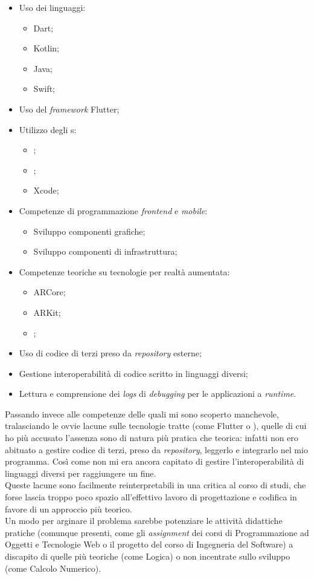 \begin{itemize}
  \item Uso dei linguaggi:
      \begin{itemize}
        \item Dart;
        \item Kotlin;
        \item Java;
        \item Swift;
      \end{itemize}
  \item Uso del \textit{framework} Flutter;
  \item Utilizzo degli \ide{}s:
      \begin{itemize}
        \item \vsc{};
        \item \astudio{};
        \item Xcode;
      \end{itemize}
  \item Competenze di programmazione \textit{frontend} e \textit{mobile}:
      \begin{itemize}
        \item Sviluppo componenti grafiche;
        \item Sviluppo componenti di infrastruttura;
      \end{itemize}
  \item Competenze teoriche su tecnologie per realtà aumentata:
      \begin{itemize}
        \item ARCore;
        \item ARKit;
        \item \asa;
      \end{itemize}
  \item Uso di codice di terzi preso da \textit{repository} esterne;
  \item Gestione interoperabilità di codice scritto in linguaggi diversi;
  \item Lettura e comprensione dei \textit{logs} di \textit{debugging} per le applicazioni a \textit{runtime}.
\end{itemize}

Passando invece alle competenze delle quali mi sono scoperto manchevole, tralasciando le ovvie lacune sulle tecnologie tratte (come Flutter o \asa{}), quelle di cui ho più accusato l'assenza sono di natura più pratica che teorica: infatti non ero abituato a gestire codice di terzi, preso da \textit{repository}, leggerlo e integrarlo nel mio programma. Così come non mi era ancora capitato di gestire l'interoperabilità di linguaggi diversi per raggiungere un fine.\\
Queste lacune sono facilmente reinterpretabili in una critica al corso di studi, che forse lascia troppo poco spazio all'effettivo lavoro di progettazione e codifica in favore di un approccio più teorico.\\
Un modo per arginare il problema sarebbe potenziare le attività didattiche pratiche (comunque presenti, come gli \textit{assignment} dei corsi di Programmazione ad Oggetti e Tecnologie Web o il progetto del corso di Ingegneria del Software) a discapito di quelle più teoriche (come Logica) o non incentrate sullo sviluppo (come Calcolo Numerico).
